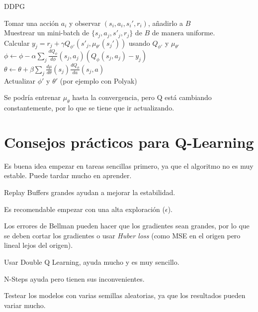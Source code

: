 \begin{itemize}
        \begin{algorithm}
            \caption{DDPG}
            \label{alg:ddpg}
            {
                Tomar una acción $a_i$ y observar $(s_i,a_i,s_i',r_i)$, añadirlo a  $B$ \\
                Muestrear un mini-batch de $\{s_j,a_j,s'_j,r_j\}$ de  $B$ de manera uniforme.\\
                Calcular $y_j=r_j+\gamma Q_{\phi'}(s'_j,\mu_{\theta'}(s_j'))$
                usando  $Q_{\phi'}$ y $\mu_{\theta'}$\\
                $ \phi \leftarrow \phi - \alpha \sum _ { j } \frac { d Q _ { \phi } } { d \phi } ( s
                _ { j } , a _ { j } ) ( Q _ { \phi } ( s _ { j } , a _ { j } ) - y _ { j } ) $\\
                $ \theta \leftarrow \theta + \beta \sum _ { j } \frac { d \mu } { d \theta } ( s _ {
                j } ) \frac { d Q _ { \phi } } { d a } ( s _ { j } , a ) $\\
                Actualizar $\phi'$ y  $\theta'$ (por ejemplo con Polyak)
            }
        \end{algorithm}

        Se podría entrenar $\mu_\theta$ hasta la convergencia, pero Q está cambiando
        constantemente, por lo que se tiene que ir actualizando.
\end{itemize}

\section{Consejos prácticos para Q-Learning}%
\label{sec:consejos_prácticos_para_q_learning}

Es buena idea empezar en tareas sencillas primero, ya que el algoritmo no es muy estable. Puede
tardar mucho en aprender.

Replay Buffers grandes ayudan a mejorar la estabilidad.

Es recomendable empezar con una alta exploración ($\epsilon$).

Los errores de Bellman pueden hacer que los gradientes sean grandes, por lo que se deben cortar
los gradientes o usar \textit{Huber loss} (como MSE en el origen pero lineal lejos del origen).

Usar Double Q Learning, ayuda mucho y es muy sencillo.

N-Steps ayuda pero tienen sus inconvenientes.

Testear los modelos con varias semillas aleatorias, ya que los resultados pueden variar mucho.

